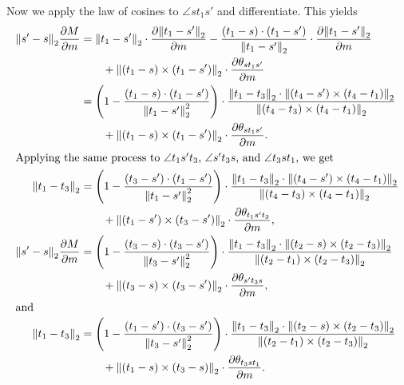 \begin{itemize}
	Now we apply the law of cosines to \(\angle st_1s'\) and differentiate. This yields \begin{align*}
		\norm{s' - s}_2\frac{\partial M}{\partial m} &= \norm{t_1 - s'}_2 \cdot \frac{\partial\norm{t_1 - s'}_2}{\partial m} - \frac{\pof{t_1 - s} \cdot \pof{t_1 - s'}}{\norm{t_1 - s'}_2} \cdot \frac{\partial\norm{t_1 - s'}_2}{\partial m} \\
		&\qquad + \norm{\pof{t_1 - s} \times \pof{t_1 - s'}}_2 \cdot \frac{\partial\theta_{st_1s'}}{\partial m} \\
		&= \pof{1 - \frac{\pof{t_1 - s} \cdot \pof{t_1 - s'}}{\norm{t_1 - s'}_2^2}} \cdot \frac{\norm{t_1 - t_3}_2 \cdot \norm{\pof{t_4 - s'} \times \pof{t_4 - t_1}}_2}{\norm{\pof{t_4 - t_3} \times \pof{t_4 - t_1}}_2} \\
		&\qquad+ \norm{\pof{t_1 - s} \times \pof{t_1 - s'}}_2 \cdot \frac{\partial\theta_{st_1s'}}{\partial m}. \\
		\intertext{Applying the same process to \(\angle t_1s't_3\), \(\angle s't_3s\), and \(\angle t_3st_1\), we get}
		\norm{t_1 - t_3}_2 &= \pof{1 - \frac{\pof{t_3 - s'} \cdot \pof{t_1 - s'}}{\norm{t_1 - s'}_2^2}} \cdot \frac{\norm{t_1 - t_3}_2 \cdot \norm{\pof{t_4 - s'} \times \pof{t_4 - t_1}}_2}{\norm{\pof{t_4 - t_3} \times \pof{t_4 - t_1}}_2} \\
		&\qquad+ \norm{\pof{t_1 - s'} \times \pof{t_3 - s'}}_2 \cdot \frac{\partial\theta_{t_1s't_3}}{\partial m}, \\
		\norm{s' - s}_2\frac{\partial M}{\partial m} &= \pof{1 - \frac{\pof{t_3 - s} \cdot \pof{t_3 - s'}}{\norm{t_3 - s'}_2^2}} \cdot \frac{\norm{t_1 - t_3}_2 \cdot \norm{\pof{t_2 - s} \times \pof{t_2 - t_3}}_2}{\norm{\pof{t_2 - t_1} \times \pof{t_2 - t_3}}_2} \\
		&\qquad+ \norm{\pof{t_3 - s} \times \pof{t_3 - s'}}_2 \cdot \frac{\partial\theta_{s't_3s}}{\partial m}, \\
		\intertext{and}
		\norm{t_1 - t_3}_2 &= \pof{1 - \frac{\pof{t_1 - s'} \cdot \pof{t_3 - s'}}{\norm{t_3 - s'}_2^2}} \cdot \frac{\norm{t_1 - t_3}_2 \cdot \norm{\pof{t_2 - s} \times \pof{t_2 - t_3}}_2}{\norm{\pof{t_2 - t_1} \times \pof{t_2 - t_3}}_2} \\
		&\qquad+ \norm{\pof{t_1 - s} \times \pof{t_3 - s}}_2 \cdot \frac{\partial\theta_{t_3st_1}}{\partial m}.
	\end{align*}


\end{itemize}
